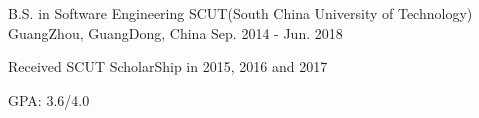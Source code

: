 \begin{cventries}
  \cventry
    {B.S. in Software Engineering}
    {SCUT(South China University of Technology)}
    {GuangZhou, GuangDong, China}
    {Sep. 2014 - Jun. 2018}
    {
      \begin{cvitems}
        \item {Received SCUT ScholarShip in 2015, 2016 and 2017}
        \item {GPA: 3.6/4.0}
      \end{cvitems}
    }
\end{cventries}
